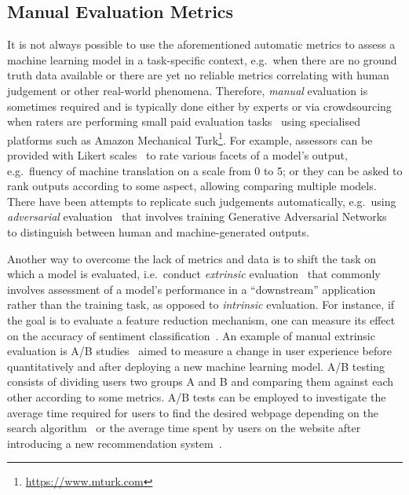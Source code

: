 \subsection{Manual Evaluation Metrics}
It is not always possible to use the aforementioned automatic metrics to assess a machine learning model in a task-specific context, e.g.\ when there are no ground truth data available or there are yet no reliable metrics correlating with human judgement or other real-world phenomena.
Therefore, \emph{manual} evaluation is sometimes required and is typically done either by experts or via crowdsourcing when raters are performing small paid evaluation tasks~\citep{Alonso2008} using specialised platforms such as Amazon Mechanical Turk\footnote{\url{https://www.mturk.com}}.
For example, assessors can be provided with Likert scales~\citep{Likert1932} to rate various facets of a model's output, e.g.\ fluency of machine translation on a scale from 0 to 5;
or they can be asked to rank outputs according to some aspect, allowing comparing multiple models.
%
There have been attempts to replicate such judgements automatically, e.g.\
using \emph{adversarial} evaluation~\citep{martin2018speech} that
involves training Generative Adversarial Networks~\citep{Goodfellow2014} to distinguish between human and machine-generated outputs.

Another way to overcome the lack of metrics and data is to shift the task on which a model is evaluated, i.e.\ conduct \emph{extrinsic} evaluation~\citep{Belz2008} that commonly involves assessment of a model's performance in a ``downstream'' application rather than the training task, as opposed to \emph{intrinsic} evaluation.
For instance, if the goal is to evaluate a feature reduction mechanism, one can measure its effect on the accuracy of sentiment classification~\citep{Schnabel2015}.
%
An example of manual extrinsic evaluation is A/B studies~\citep{Hofmann2016} aimed to measure a change in user experience before quantitatively and after deploying a new machine learning model.
A/B testing consists of dividing users two groups A and B and comparing them against each other according to some metrics.
%
A/B tests can be employed to investigate the average time required for users to find the desired webpage depending on the search algorithm~\citep{Manning2008}
or the average time spent by users on the website after introducing a new recommendation system~\citep{Davidson2010}.

